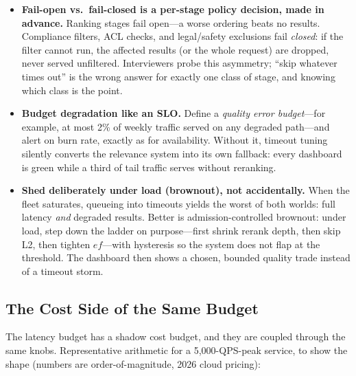\begin{itemize}
    \item \textbf{Fail-open vs.\ fail-closed is a per-stage policy decision, made in advance.} Ranking stages fail open---a worse ordering beats no results. Compliance filters, ACL checks, and legal/safety exclusions fail \textit{closed}: if the filter cannot run, the affected results (or the whole request) are dropped, never served unfiltered. Interviewers probe this asymmetry; ``skip whatever times out'' is the wrong answer for exactly one class of stage, and knowing which class is the point.
    \item \textbf{Budget degradation like an SLO.} Define a \textit{quality error budget}---for example, at most 2\% of weekly traffic served on any degraded path---and alert on burn rate, exactly as for availability. Without it, timeout tuning silently converts the relevance system into its own fallback: every dashboard is green while a third of tail traffic serves without reranking.
    \item \textbf{Shed deliberately under load (brownout), not accidentally.} When the fleet saturates, queueing into timeouts yields the worst of both worlds: full latency \textit{and} degraded results. Better is admission-controlled brownout: under load, step down the ladder on purpose---first shrink rerank depth, then skip L2, then tighten $ef$---with hysteresis so the system does not flap at the threshold. The dashboard then shows a chosen, bounded quality trade instead of a timeout storm.
\end{itemize}

\subsection{The Cost Side of the Same Budget}

The latency budget has a shadow cost budget, and they are coupled through the same knobs. Representative arithmetic for a 5{,}000-QPS-peak service, to show the shape (numbers are order-of-magnitude, 2026 cloud pricing):

